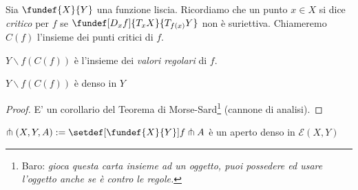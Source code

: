 \begin{defn} Sia $\fundef{X}{Y}$ una funzione liscia. Ricordiamo che un punto $x \in X$ si dice \emph{critico} per $f$ se $\fundef[D_xf]{T_xX}{T_{f(x)}Y}$ non è suriettiva. Chiameremo $C(f)$ l'insieme dei punti critici di $f$.
\end{defn}

\begin{oss}
$Y \backslash f(C(f))$ è l'insieme dei \emph{valori regolari} di $f$.
\end{oss}

\begin{teo}[Brown]
$Y \backslash f(C(f))$ è denso in $Y$
\end{teo}

\begin{proof}
E' un corollario del Teorema di Morse-Sard\footnote{Baro: \emph{gioca questa carta insieme ad un oggetto, puoi possedere ed usare l'oggetto anche se è contro le regole.}} (cannone di analisi).
\end{proof}

\begin{teo}
$\pitchfork(X,Y,A) := \setdef[\fundef{X}{Y}]{f \pitchfork A}$ è un aperto denso in $\mathcal{E}(X,Y)$
\end{teo}

